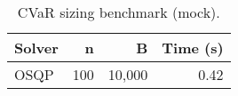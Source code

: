 \begin{table}[t]
  \centering
  \small
  \caption{CVaR sizing benchmark (mock).}
  \begin{tabular}{lrrr}
    \toprule
    Solver & n & B & Time (s) \\
    \midrule
    OSQP & 100 & 10{,}000 & 0.42 \\
    \bottomrule
  \end{tabular}
\end{table}
